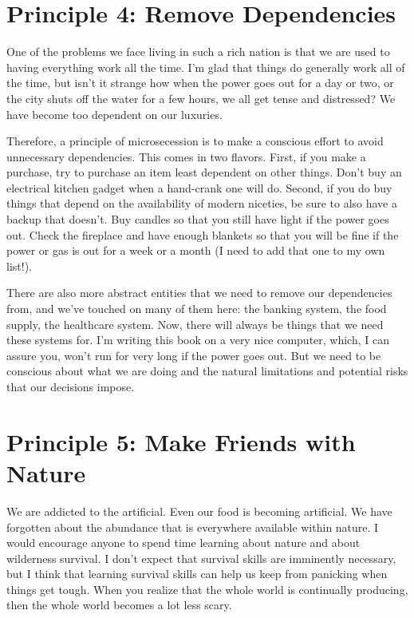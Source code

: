 \section{Principle 4: Remove Dependencies}

One of the problems we face living in such a rich nation is that we are
used to having everything work all the time. I'm glad
that things do generally work all of the time, but
isn't it strange how when the power goes out for a day
or two, or the city shuts off the water for a few hours, we all get
tense and distressed? We have become too dependent on our luxuries.

Therefore, a principle of microsecession is to make a conscious effort
to avoid unnecessary dependencies. This comes in two flavors. First, if
you make a purchase, try to purchase an item least dependent on other
things. Don't buy an electrical kitchen gadget when a
hand-crank one will do. Second, if you do buy things that depend on the
availability of modern niceties, be sure to also have a backup that
doesn't. Buy candles so that you still have light if
the power goes out. Check the fireplace and have enough blankets so
that you will be fine if the power or gas is out for a week or a month
(I need to add that one to my own list!).

There are also more abstract entities that we need to remove our
dependencies from, and
we’ve touched on many of them here: the banking system, the food
supply, the healthcare system. Now, there will always be things that
we need these systems for. I'm writing this book on a
very nice computer, which, I can assure you, won't run
for very long if the power goes out. But we need to be conscious about
what we are doing and the natural limitations and potential risks that
our decisions impose.

\section{Principle 5: Make Friends with Nature}

We are addicted to the artificial. Even our food is becoming artificial.
We have forgotten about the abundance that is everywhere available
within nature. I would encourage anyone to spend time learning about
nature and about wilderness survival. I don't expect
that survival skills are imminently necessary, but I think that
learning survival skills can help us keep from panicking
when things get tough. When you realize that the whole world is
continually producing, then the whole world becomes a lot less scary.

